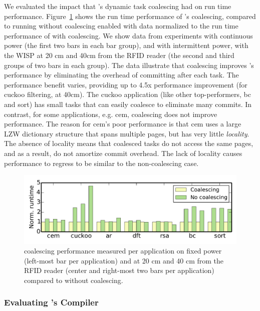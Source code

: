 We evaluated the impact that \sys's dynamic task coalescing had on run time
performance.  Figure~\ref{fig:coalescing} shows the run time performance of
\sys's coalescing, compared to \sys running without coalescing enabled with
data normalized to the run time performance of \sys with coalescing.  We show
data from experiments with continuous power (the first two bars in each bar
group), and with intermittent power, with the WISP at 20 cm and 40cm from the
RFID reader (the second and third groups of two bars in each group).
%
The data illustrate that coalescing improves \sys's performance by eliminating
the overhead of committing after each task.  The performance benefit varies,
providing up to 4.5x performance improvement (for cuckoo filtering, at 40cm).
The cuckoo application (like other top-performers, bc and sort) has small tasks
that \sys can easily coalesce to eliminate many commits. In contrast, for some
applications, e.g. cem, coalescing does not improve performance. The reason for
cem's poor performance is that cem uses a large LZW dictionary structure that
spans multiple pages, but has very little {\em locality}.  The absence of
locality means that coalesced tasks do not access the same pages, and as a
result, do not amortize commit overhead. The lack of locality causes
performance to regress to be similar to the non-coalescing case. 

\begin{figure}
	\centering
	\includegraphics[width=\columnwidth]{figures/coalescing}
	\caption{\sys coalescing performance measured per application on fixed power (left-most bar per application) and at 20 cm and 40 cm from the RFID reader (center and right-most two bars per application) compared to \sys without coalescing.}
	\label{fig:coalescing}
\end{figure}


\subsubsection{Evaluating \sys's Compiler}
\label{sec:result_compiler_time}
\label{sec:results_compiler}

